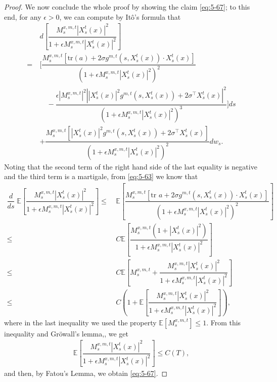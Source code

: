 \documentclass[11pt]{article}
\numberwithin{equation}{section}
\newcommand{\e}{\mathbb{E}}
\newcommand{\1}{\mbox{1\hspace{-1mm}I}}
\begin{document}
\begin{proof}
We now conclude the whole proof by showing the claim \eqref{eq:5-67}; to this end, for any $\epsilon>0$, we can compute by It\^o's formula that
\begin{align*}
    &d\left[\dfrac{M^{x,m,t}_s\left|X^{t}_s(x)\right|^{2}}{1+\epsilon M^{x,m,t}_s\left|X^{t}_s(x)\right|^{2}}\right]\\
    =\ & \Bigg[ \dfrac{M^{x,m,t}_s\left[\text{tr}(a)+2\sigma g^{m,t}\left(s,X^{t}_s(x)\right)\cdot X^{t}_s(x)\right]}{\left(1+\epsilon M^{x,m,t}_s\left|X^{t}_s(x)\right|^{2}\right)^{2}} \\
    &\quad - \dfrac{\epsilon \left|M^{x,m,t}_s\right|^{2} \left|\left|X^{t}_s(x)\right|^{2}g^{m,t}\left(s,X^{t}_s(x)\right)+2\sigma^\top X^{t}_s(x)\right|^2}{\left(1+\epsilon M^{x,m,t}_s\left|X^{t}_s(x)\right|^{2}\right)^{3}} \Bigg] ds\\
    &+ \dfrac{M^{x,m,t}_s\left[\left|X^{t}_s(x)\right|^{2}g^{m,t}\left(s,X^{t}_s(x)\right)+2\sigma^\top X^{t}_s(x)\right]}{(1+\epsilon M^{x,m,t}_s\left|X^{t}_s(x)\right|^{2})^{2}}dw_s.
\end{align*} 
Noting that the second term of the right hand side of the last equality is negative and the third term is a martigale, from \eqref{eq:5-63} we know that 
\begin{align*}
    \dfrac{d}{ds}\;\e\left[\dfrac{M^{x,m,t}_s\left|X^{t}_s(x)\right|^{2}}{1+\epsilon M^{x,m,t}_s\left|X^{t}_s(x)\right|^{2}}\right]\le\ &  \e \left[\dfrac{M^{x,m,t}_s \left[\text{tr }a+2\sigma g^{m,t}\left(s,X^{t}_s(x)\right)\cdot X^{t}_s(x)\right]}{\left(1+\epsilon M^{x,m,t}_s\left|X^{t}_s(x)\right|^{2}\right)^{2}} \right]\\
    \le\ & C\e \left[\dfrac{M^{x,m,t}_s \left(1+\left|X^{t}_s(x)\right|^2 \right)}{1+\epsilon M^{x,m,t}_s\left|X^{t}_s(x)\right|^{2}} \right]\\
    \le\ & C\e \left[M^{x,m,t}_s + \dfrac{M^{x,m,t}_s \left|X^{t}_s(x)\right|^2 }{1+\epsilon M^{x,m,t}_s\left|X^{t}_s(x)\right|^{2}}\right]\\
    \le\ & C\left(1+ \e\left[\dfrac{M^{x,m,t}_s\left|X^{t}_s(x)\right|^{2}}{1+\epsilon M^{x,m,t}_s\left|X^{t}_s(x)\right|^{2}}\right] \right),
\end{align*}
where in the last inequality we used the property $\e\left[M^{x,m,t}_s\right]\le 1$. From this inequality and Gr\"owall's lemma,, we get
\begin{align*}
    \e\left[\dfrac{M^{x,m,t}_s\left|X^{t}_s(x)\right|^{2}}{1+\epsilon M^{x,m,t}_s\left|X^{t}_s(x)\right|^{2}}\right] \le C(T),
\end{align*}
and then, by Fatou's Lemma, we obtain \eqref{eq:5-67}. 
\end{proof}
\end{document}
